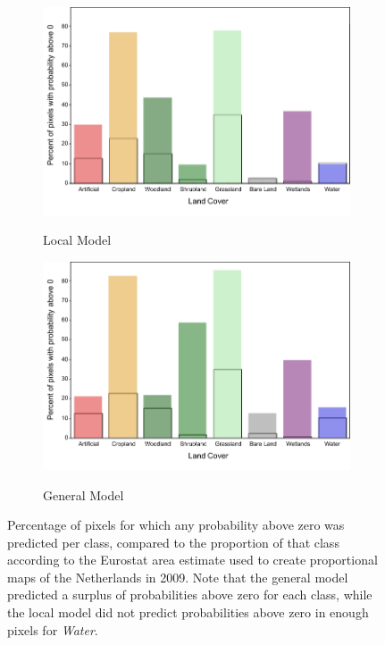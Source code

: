     \begin{figure}[H]
        \centering
        \begin{subfigure}[b]{0.9\textwidth}
            \centering
            \caption{Local Model}\includegraphics[width=\textwidth]{figs_04/fig7a_probability_pixels_NL_local.pdf}
            \label{fig:probability_pixels_local}
        \end{subfigure}
        \begin{subfigure}[b]{0.9\textwidth}
           \centering
           \caption{General Model}
           \includegraphics[width=\textwidth]{figs_04/fig7b_probability_pixels_NL_general.pdf}
           \label{fig:probability_pixels_general}   
        \end{subfigure}
        
        \caption{Percentage of pixels for which any probability above zero was predicted per class, compared to the proportion of that class according to the Eurostat area estimate used to create proportional maps of the Netherlands in 2009. Note that the general model predicted a surplus of probabilities above zero for each class, while the local model did not predict probabilities above zero in enough pixels for \textit{Water}.}
        \label{fig:probability_pixels}
    \end{figure}



